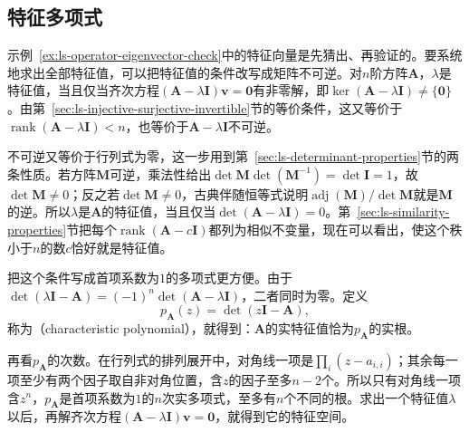 \subsection{特征多项式}
\label{sec:ls-characteristic-polynomial}

示例~\ref{ex:ls-operator-eigenvector-check}中的特征向量是先猜出、再验证的。要系统地求出全部特征值，可以把特征值的条件改写成矩阵不可逆。对$n$阶方阵$\bm A$，$\lambda$是特征值，当且仅当齐次方程$(\bm A-\lambda\bm I)\bm v=\bm0$有非零解，即$\ker(\bm A-\lambda\bm I)\neq\{\bm0\}$。由第~\ref{sec:ls-injective-surjective-invertible}节的等价条件，这又等价于$\operatorname{rank}(\bm A-\lambda\bm I)<n$，也等价于$\bm A-\lambda\bm I$不可逆。

不可逆又等价于行列式为零，这一步用到第~\ref{sec:ls-determinant-properties}节的两条性质。若方阵$\bm M$可逆，乘法性给出$\det\bm M\det(\bm M^{-1})=\det\bm I=1$，故$\det\bm M\neq0$；反之若$\det\bm M\neq0$，古典伴随恒等式说明$\operatorname{adj}(\bm M)/\det\bm M$就是$\bm M$的逆。所以$\lambda$是$\bm A$的特征值，当且仅当$\det(\bm A-\lambda\bm I)=0$。第~\ref{sec:ls-similarity-properties}节把每个$\operatorname{rank}(\bm A-c\bm I)$都列为相似不变量，现在可以看出，使这个秩小于$n$的数$c$恰好就是特征值。

把这个条件写成首项系数为$1$的多项式更方便。由于$\det(\lambda\bm I-\bm A)=(-1)^n\det(\bm A-\lambda\bm I)$，二者同时为零。定义
\begin{equation}
 p_{\bm A}(z)=\det(z\bm I-\bm A),
 \label{eq:matrix-analysis-characteristic-polynomial}
\end{equation}
称为（characteristic polynomial），就得到：$\bm A$的实特征值恰为$p_{\bm A}$的实根。

再看$p_{\bm A}$的次数。在行列式的排列展开中，对角线一项是$\prod_i(z-a_{i,i})$；其余每一项至少有两个因子取自非对角位置，含$z$的因子至多$n-2$个。所以只有对角线一项含$z^n$，$p_{\bm A}$是首项系数为$1$的$n$次实多项式，至多有$n$个不同的根。求出一个特征值$\lambda$以后，再解齐次方程$(\bm A-\lambda\bm I)\bm v=\bm0$，就得到它的特征空间。

